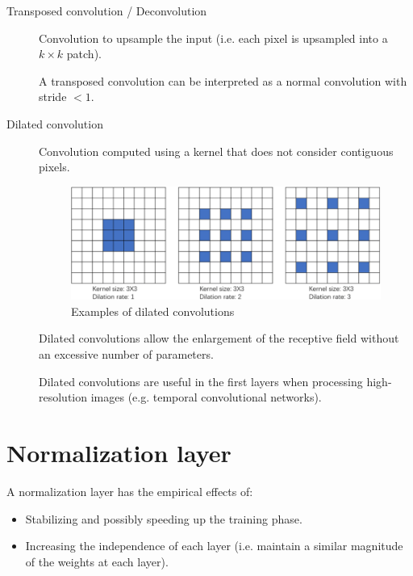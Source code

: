 \begin{description}
    \item[Transposed convolution / Deconvolution] 
        Convolution to upsample the input (i.e. each pixel is upsampled into a $k \times k$ patch).

        \begin{remark}
            A transposed convolution can be interpreted as a normal convolution with stride $< 1$.
        \end{remark}


    \item[Dilated convolution] 
        Convolution computed using a kernel that does not consider contiguous pixels.

        \begin{figure}[H]
            \centering
            \includegraphics[width=0.5\linewidth]{./img/dilated_convolution.png}
            \caption{Examples of dilated convolutions}
        \end{figure}

        \begin{remark}
            Dilated convolutions allow the enlargement of the receptive field without an excessive number of parameters.
        \end{remark}

        \begin{remark}
            Dilated convolutions are useful in the first layers when processing high-resolution images (e.g. temporal convolutional networks).
        \end{remark}
\end{description}



\section{Normalization layer}

A normalization layer has the empirical effects of:
\begin{itemize}
    \item Stabilizing and possibly speeding up the training phase.
    \item Increasing the independence of each layer (i.e. maintain a similar magnitude of the weights at each layer).
\end{itemize}

